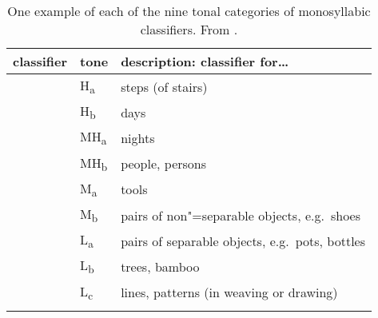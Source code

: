 \begin{refsection}
\begin{table}[h]
	\caption{One example of each of the nine tonal categories of monosyllabic classifiers. From .}
	\begin{tabularx}{\textwidth}{ Q Q l }
		\lsptoprule
		classifier & tone & description: classifier for{\dots}\\ \midrule
		 & H\textsubscript{a} & steps (of stairs)\\
		 & H\textsubscript{b} & days\\
		 & MH\textsubscript{a} & nights\\
		 & MH\textsubscript{b} & people, persons\\
		 & M\textsubscript{a} & tools\\
		 & M\textsubscript{b} & pairs of non"=separable objects, e.g.~shoes\\
		 & L\textsubscript{a} & pairs of separable objects, e.g.~pots, bottles\\
		 & L\textsubscript{b} & trees, bamboo\\
		 & L\textsubscript{c} & lines, patterns (in weaving or drawing)\\
		\lspbottomrule
	\end{tabularx}
	\label{tab:TONECLREF}
\end{table}


\end{refsection}

